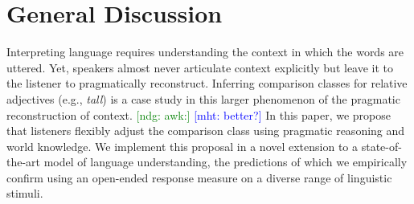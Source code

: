 \documentclass[doc]{apa6}
\newcommand{\red}[1]{\textcolor{Red}{#1}}
\newcommand{\ndg}[1]{\textcolor{Green}{[ndg: #1]}}
\newcommand{\mht}[1]{\textcolor{Blue}{[mht: #1]}}
\begin{document}
\section{General Discussion}



%
%
%
%
%
%
%
%
%
%














Interpreting language requires understanding the context in which the words are uttered.
Yet, speakers almost never articulate context explicitly but leave it to the listener to pragmatically reconstruct.
Inferring comparison classes for relative adjectives (e.g., \emph{tall}) is a case study in this larger phenomenon of the pragmatic reconstruction of context.
\ndg{awk:} \mht{better?}
In this paper, we propose that listeners flexibly adjust the comparison class using pragmatic reasoning and world knowledge. 
We implement this proposal in a novel extension to a state-of-the-art model of language understanding, the predictions of which we empirically confirm using an open-ended response measure on a diverse range of linguistic stimuli.
\end{document}
